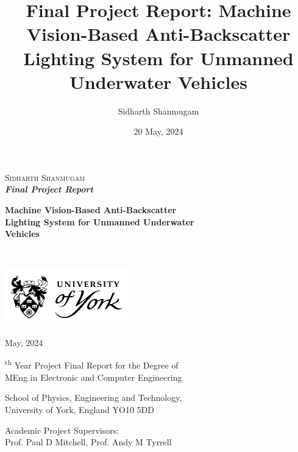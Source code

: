 \documentclass[12pt]{article}
\title{Final Project Report: Machine Vision-Based Anti-Backscatter Lighting System for Unmanned Underwater Vehicles}
\author{Sidharth Shanmugam}
\date{20 May, 2024}
\begin{document}
\begin{onehalfspace}
    \begin{titlepage}

        \begin{FlushLeft}
            \textsc{\LARGE Sidharth Shanmugam}\\[0.8cm]
    
            \Large{
                \bfseries{
                    \emph{Final Project Report}}}
            
            \hrulefill
    
            
            \LARGE{
                \bfseries{
                    Machine Vision-Based Anti-Backscatter\\ Lighting System for Unmanned Underwater\\ Vehicles}}
            
            \hrulefill\\[7.2cm]
    
        \end{FlushLeft}
        
        \vfill

        
        \centering
        \includegraphics[width=0.4\textwidth]{assets/uoy-logo-stacked-shield.png}

        \vfill
        
        \textsf{ May, 2024}
        
        \vfill
        
        \textsf{\textsuperscript{th} Year Project Final Report for the Degree of\\ MEng in Electronic and Computer Engineering}
        
        \vfill
        
        \textsf{\centering
                School of Physics, Engineering and Technology,\\University of York, England YO10 5DD}
        
        \vfill    
        
        \textsf{\centering
                Academic Project Supervisors:\\ Prof. Paul D Mitchell, Prof. Andy M Tyrrell}
        
    \end{titlepage}
\end{onehalfspace}
\end{document}
